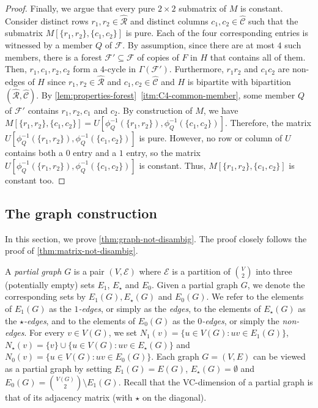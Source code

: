 \documentclass[11pt]{article}
\theoremstyle{remark}
\begin{document}
\begin{proof}
    Finally, we argue that every pure $2 \times 2$ submatrix of $M$ is constant.
    Consider distinct rows $r_1, r_2 \in \widehat{\mathcal{R}}$ and distinct columns $c_1, c_2 \in \widehat{\mathcal{C}}$ such that the submatrix $M[\{r_1, r_2\}, \{c_1, c_2\}]$ is pure.
    Each of the four corresponding entries is witnessed by a member $Q$ of $\mathcal{F}$.
    By assumption, since there are at most $4$ such members, there is a forest $\mathcal{F}' \subseteq \mathcal{F}$ of copies of $F$ in $H$ that contains all of them.
    Then, $r_1, c_1, r_2, c_2$ form a $4$-cycle in $\Gamma(\mathcal{F}')$.
    Furthermore, $r_1r_2$ and $c_1c_2$ are non-edges of $H$ since $r_1, r_2 \in \widehat{\mathcal{R}}$ and $c_1, c_2 \in \widehat{\mathcal{C}}$ and $H$ is bipartite with bipartition $(\widehat{\mathcal{R}}, \widehat{\mathcal{C}})$.
    By \cref{lem:properties-forest}~\ref{itm:C4-common-member}, some member $Q$ of $\mathcal{F}'$ contains $r_1, r_2, c_1$ and $c_2$.
    By construction of $M$, we have $M[\{r_1, r_2\}, \{c_1, c_2\}] = U[\phi_Q^{-1}(\{r_1, r_2\}), \phi_Q^{-1}(\{c_1, c_2\})]$.
    Therefore, the matrix $U[\phi_Q^{-1}(\{r_1, r_2\}), \phi_Q^{-1}(\{c_1, c_2\})]$ is pure.
    However, no row or column of $U$ contains both a $0$ entry and a $1$ entry, so the matrix $U[\phi_Q^{-1}(\{r_1, r_2\}), \phi_Q^{-1}(\{c_1, c_2\})]$ is constant.
    Thus, $M[\{r_1, r_2\}, \{c_1, c_2\}]$ is constant too.
\end{proof}

\subsection{The graph construction}

In this section, we prove \cref{thm:graph-not-disambig}.
The proof closely follows the proof of \cref{thm:matrix-not-disambig}.

A \emph{partial graph} $G$ is a pair $(V, \mathcal{E})$ where $\mathcal{E}$ is a partition of $\binom{V}{2}$ into three (potentially empty) sets $E_1$, $E_\star$ and $E_0$.
Given a partial graph $G$, we denote the corresponding sets by $E_1(G), E_{\star}(G)$ and $E_0(G)$.
We refer to the elements of $E_1(G)$ as the \emph{$1$-edges}, or simply as the \emph{edges}, to the elements of $E_{\star}(G)$ as the \emph{$\star$-edges}, and to the elements of $E_0(G)$ as the \emph{$0$-edges}, or simply the \emph{non-edges}.
For every $v \in V(G)$, we set $N_1(v) = \{u \in V(G) : uv \in E_1(G)\}$, $N_{\star}(v) = \{v\} \cup \{u \in V(G) : uv \in E_\star(G)\}$ and $N_0(v) = \{u \in V(G) : uv \in E_0(G)\}$.
Each graph $G = (V, E)$ can be viewed as a partial graph by setting $E_1(G) = E(G)$, $E_\star(G) = \emptyset$ and $E_0(G) = \binom{V(G)}{2} \setminus E_1(G)$.
Recall that the VC-dimension of a partial graph is that of its adjacency matrix (with $\star$ on the diagonal).
\end{document}
